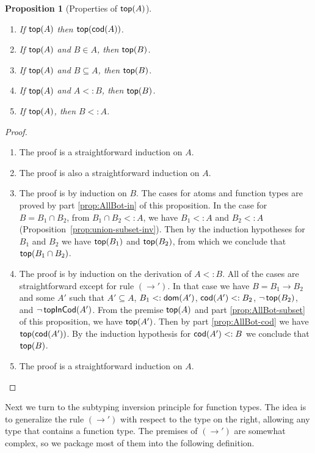 \documentclass{article}
\newtheorem{proposition}[theorem]{Proposition}
\begin{document}
\begin{proposition}[Properties of $\mathsf{top}(A)$]\ \label{prop:top}
  \begin{enumerate}
  \item If $\mathsf{top}(A)$ then $\mathsf{top}(\mathsf{cod}(A))$.\label{prop:AllBot-cod}
  \item If $\mathsf{top}(A)$ and $B \in A$, then $\mathsf{top}(B)$.\label{prop:AllBot-in}
  \item If $\mathsf{top}(A)$ and $B \subseteq A$, then $\mathsf{top}(B)$.\label{prop:AllBot-subset}
  \item If $\mathsf{top}(A)$ and $A <: B$, then $\mathsf{top}(B)$.\label{prop:AllBot-⊑}
  \item If $\mathsf{top}(A)$, then $B <: A$.\label{prop:AllBot-⊑-any}
  \end{enumerate}
\end{proposition}
\begin{proof}\
  \begin{enumerate}
  \item The proof is a straightforward induction on $A$.
  \item The proof is also a straightforward induction on $A$.
  \item The proof is by induction on $B$. The cases for atoms and
    function types are proved by part \ref{prop:AllBot-in} of
    this proposition. In the case for
    $B = B_1 \cap B_2$, from $B_1 \cap B_2 <: A$, we have
    $B_1 <: A$ and $B_2 <: A$ (Proposition~\ref{prop:union-subset-inv}).
    Then by the induction hypotheses for $B_1$ and $B_2$ we have
    $\mathsf{top}(B_1)$ and $\mathsf{top}(B_2)$, from which we conclude
    that $\mathsf{top}(B_1 \cap B_2)$.
  \item The proof is by induction on the derivation of $A <: B$.
    All of the cases are straightforward except for rule $(\to')$.
    In that case we have $B = B_1 \to B_2$ and some $A'$ such that
    $A' \subseteq A$, $B_1 <: \mathsf{dom}(A')$, $\mathsf{cod}(A') <: B_2$, $\neg\,\mathsf{top}(B_2)$,
    and $\neg\,\mathsf{topInCod}(A')$. From the premise $\mathsf{top}(A)$
    and part \ref{prop:AllBot-subset} of this proposition, we
    have $\mathsf{top}(A')$. Then by part \ref{prop:AllBot-cod}
    we have $\mathsf{top}(\mathsf{cod}(A'))$. By the induction hypothesis
    for $\mathsf{cod}(A') <: B$ we conclude that $\mathsf{top}(B)$.
  \item The proof is a straightforward induction on $A$.
  \end{enumerate}
\end{proof}

Next we turn to the subtyping inversion principle for function types.
The idea is to generalize the rule $(\to')$ with respect to the type on
the right, allowing any type that contains a function type.  The
premises of $(\to')$ are somewhat complex, so we package most of them
into the following definition.
\end{document}
